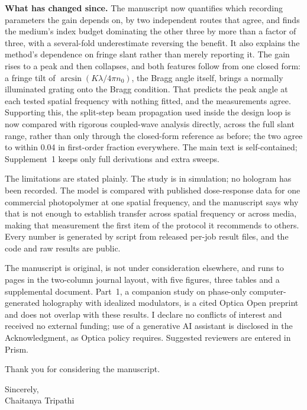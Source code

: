 \documentclass[10pt]{article}
\begin{document}
\textbf{What has changed since.} The manuscript now quantifies which recording
parameters the gain depends on, by two independent routes that agree, and finds
the medium's index budget dominating the other three by more than a factor of
three, with a several-fold underestimate reversing the benefit. It also
explains the method's dependence on fringe slant rather than merely reporting
it. The gain rises to a peak and then collapses, and both features follow from
one closed form: a fringe tilt of $\arcsin(K\lambda/4\pi n_0)$, the Bragg angle
itself, brings a normally illuminated grating onto the Bragg condition. That
predicts the peak angle at each tested spatial frequency with nothing fitted,
and the measurements agree. Supporting this, the split-step beam propagation
used inside the design loop is now compared with rigorous coupled-wave analysis
directly, across the full slant range, rather than only through the
closed-form reference as before; the two agree to within 0.04 in first-order
fraction everywhere. The main text is self-contained; Supplement~1 keeps only
full derivations and extra sweeps.

The limitations are stated plainly. The study is in simulation; no hologram has
been recorded. The model is compared with published dose-response data for one
commercial photopolymer at one spatial frequency, and the manuscript says why
that is not enough to establish transfer across spatial frequency or across
media, making that measurement the first item of the protocol it recommends to
others. Every number is generated by script from released per-job result files,
and the code and raw results are public.

The manuscript is original, is not under consideration elsewhere, and runs to
 pages in the two-column journal layout, with five figures, three
tables and a supplemental document. Part~1, a companion study on phase-only
computer-generated holography with idealized modulators, is a cited Optica Open
preprint and does not overlap with these results. I declare no conflicts of
interest and received no external funding; use of a generative AI assistant is
disclosed in the Acknowledgment, as Optica policy requires. Suggested
reviewers are entered in Prism.

Thank you for considering the manuscript.

Sincerely,\\
Chaitanya Tripathi
\end{document}
